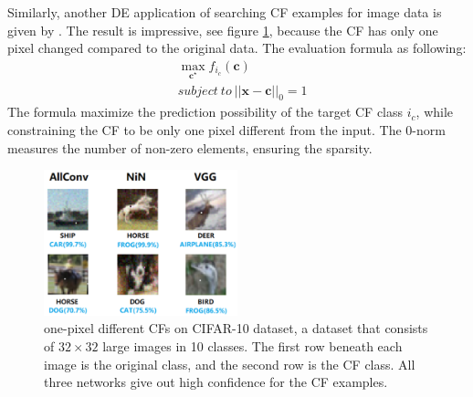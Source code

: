 Similarly, another DE application of searching CF examples for image data is given by \citeauthor{onePixel} \cite{onePixel}. The result is impressive, see figure \ref{fig:onepixel}, because the CF has only one pixel changed compared to the original data. The evaluation formula as following:
\begin{equation}\label{eq:onepixel}
  \begin{split}
     &\max_{\mathbf c^\star} f_{i_c}(\mathbf{c})\\
     &subject\ to\ ||\mathbf{x-c}||_0=1
  \end{split}
\end{equation}
The formula maximize the prediction possibility of the target CF class $i_c$, while constraining the CF to be only one pixel different from the input. The 0-norm measures the number of non-zero elements, ensuring the sparsity.
\begin{figure}
  \centering
  \includegraphics[width=0.5\textwidth]{onepixel.PNG}
  \caption{one-pixel different CFs on CIFAR-10 dataset, a dataset that consists of $32\times32$ large images in 10 classes.
  The first row beneath each image is the original class, and the second row is the CF class. All three networks give out high confidence for the CF examples.}
  \label{fig:onepixel}
\end{figure}

